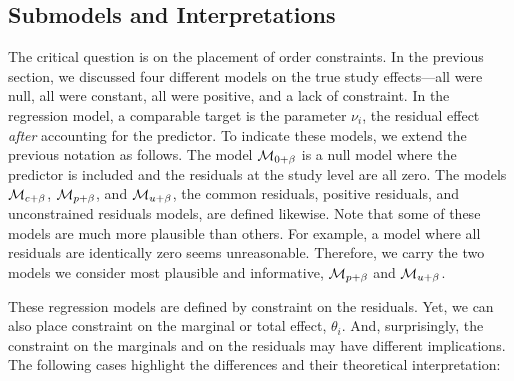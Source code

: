 \documentclass[english,,man]{apa6}
\begin{document}
\hypertarget{submodels-and-interpretations}{%
\subsection{Submodels and Interpretations}\label{submodels-and-interpretations}}

The critical question is on the placement of order constraints. In the previous section, we discussed four different models on the true study effects---all were null, all were constant, all were positive, and a lack of constraint. In the regression model, a comparable target is the parameter \(\nu_i\), the residual effect \emph{after} accounting for the predictor. To indicate these models, we extend the previous notation as follows. The model \({\cal M}_{0+\beta}\) is a null model where the predictor is included and the residuals at the study level are all zero. The models \({\cal M}_{c+\beta}\), \({\cal M}_{p+\beta}\), and \({\cal M}_{u+\beta}\), the common residuals, positive residuals, and unconstrained residuals models, are defined likewise. Note that some of these models are much more plausible than others. For example, a model where all residuals are identically zero seems unreasonable. Therefore, we carry the two models we consider most plausible and informative, \({\cal M}_{p+\beta}\) and \({\cal M}_{u+\beta}\).

These regression models are defined by constraint on the residuals. Yet, we can also place constraint on the marginal or total effect, \(\theta_i\). And, surprisingly, the constraint on the marginals and on the residuals may have different implications. The following cases highlight the differences and their theoretical interpretation:
\end{document}
